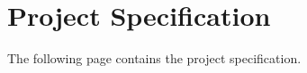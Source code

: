 \chapter{Project Specification}\label{appendix:project-spec}
The following page contains the project specification.

\ifprojectspec
    
\fi
